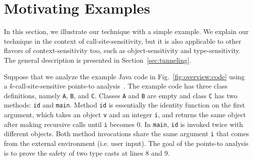 {}
\section{Motivating Examples}
\label{sec:overview}

In this section, we illustrate our technique with a simple example. We
explain our technique in the context of  call-site-sensitivity, but it
is also applicable
to other flavors of context-sensitivity too, such as object-sensitivity and
type-sensitivity. The general description is presented in
Section~\ref{sec:tunneling}.


Suppose that we analyze the example Java code in
Fig.~\ref{fig:overview:code} using a $k$-call-site-sensitive points-to
analysis~\cite{Smaragdakis2015}.  The example code has three class
definitions, namely \texttt{A}, \texttt{B}, and \texttt{C}.  Classes
\texttt{A} and \texttt{B} are empty and class \texttt{C} has two
methods: \texttt{id} and \texttt{main}.  Method \texttt{id} is
essentially the identity function on the first argument, which takes an
object \texttt{v} and an integer \texttt{i}, and returns the same
object after making recursive calls until \texttt{i} becomes 0. In
\texttt{main}, \texttt{id} is invoked twice with different
objects. Both method invocations share the same argument \texttt{i}
that comes from the external environment (i.e. user input).  The goal
of the points-to analysis is to prove the safety of two type casts at
lines 8 and 9.

